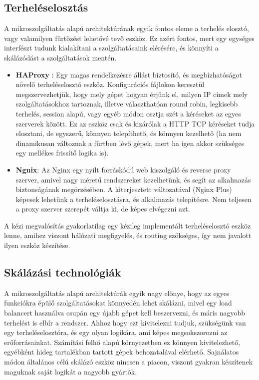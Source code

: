 \documentclass[11pt,magyar,a4paper,twoside,]{report}
\begin{document}
\subsection{Terheléselosztás}\label{terheluxe9selosztuxe1s}

A mikroszolgáltatás alapú architektúrának egyik fontos eleme a terhelés
elosztó, vagy valamilyen fürtözést lehetővé tevő eszköz. Ez azért
fontos, mert egy egységes interfészt tudunk kialakítani a
szolgáltatásaink elérésére, és könnyíti a skálázódást a szolgáltatások
mentén.

\begin{itemize}
\item
  \textbf{HAProxy}\citep{haproxy} \citep{LB-haproxy}: Egy magas
  rendelkezésre állást biztosító, és megbízhatóságot növelő
  terheléselosztó eszköz. Konfigurációs fájlokon keresztül
  megszervezhetjük, hogy mely gépet hogyan érjünk el, milyen IP címek
  mely szolgáltatásokhoz tartoznak, illetve választhatóan round robin,
  legkisebb terhelés, session alapú, vagy egyéb módon osztja szét a
  kéréseket az egyes szerverek között. Ez az eszköz csak és kizárólak a
  HTTP TCP kéréseket tudja elosztani, de egyszerű, könnyen telepíthető,
  és könnyen kezelhető (ha nem dinamikusan változnak a fürtben lévő
  gépek, mert ha igen akkor szükséges egy mellékes frissítő logika is).
\item
  \textbf{Ngnix}\citep{nginx}: Az Nginx egy nyílt forráskódú web
  kiszolgáló és reverse proxy szerver, amivel nagy méretű rendszereket
  kezelhetünk, és segít az alkalmazás biztonságának megörzésében. A
  kiterjesztett változatával (Nginx Plus) képesek lehetünk a
  terheléselosztásra, és alkalmazás telepítésre. Nem teljesen a proxy
  szerver szerepét váltja ki, de képes elvégezni azt.
\end{itemize}

A kézi megvalósítás gyakorlatilag egy kézileg implementált
terheléselosztó eszköz lenne, amihez viszont hálózati megfigyelés, és
routing szökséges, így nem javalott ilyen eszköz készítése.

\subsection{Skálázási
technológiák}\label{skuxe1luxe1zuxe1si-technoluxf3giuxe1k}

A mikroszolgáltatás alapú architektúrák egyik nagy előnye, hogy az egyes
funkciókra épülő szolgáltatásokat könnyedén lehet skálázni, mivel egy
load balancert használva csupán egy újabb gépet kell beszervezni, és
máris nagyobb terhelést is elbír a rendszer. Ahhoz hogy ezt kivitelezni
tudjuk, szükségünk van egy terheléselosztóra, és egy olyan logikára, ami
képes megsokszorozni az erőforrásainkat. Számítási felhő alapú
környezetben ez könnyen kivitelezhető, egyébként hideg tartalékban
tartott gépek behozatalával elérhető. Sajnálatos módon általános célú
skálázó eszköz nincsen a piacon, viszont gyakran készítenek maguknak
saját logikát a nagyobb gyártók.
\end{document}

